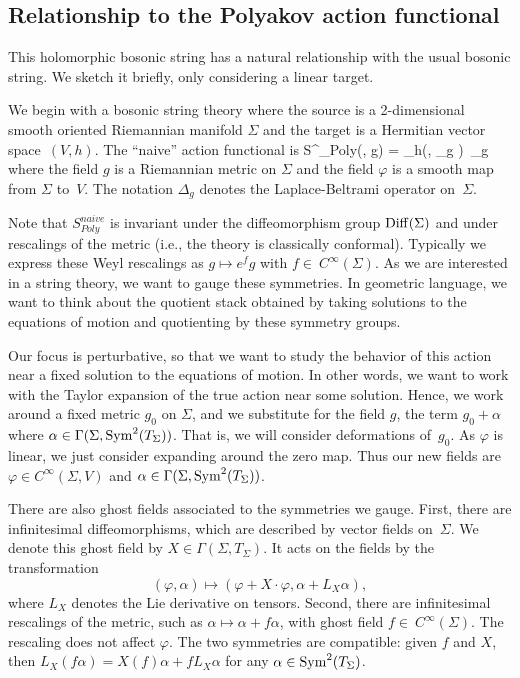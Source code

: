 \subsection{Relationship to the Polyakov action functional}

This holomorphic bosonic string has a natural relationship with the usual bosonic string.
We sketch it briefly, only considering a linear target.

We begin with a bosonic string theory where the source is a 2-dimensional smooth oriented Riemannian manifold $\Sigma$ and the target is a Hermitian vector space~$(V,h)$. 
The ``naive'' action functional is
\ben
S^{}_{Poly}(\varphi, g) = \int_\Sigma h(\varphi, \Delta_{g} \varphi)\, \dvol_g
\een
where the field $g$ is a Riemannian metric on $\Sigma$ and the field $\varphi$ is a smooth map from $\Sigma$ to~$V$.
The notation $\Delta_g$ denotes the Laplace-Beltrami operator on~$\Sigma$. 

Note that $S^{naive}_{Poly}$ is invariant under the diffeomorphism group ${\rm Diff}(\Sigma)$ and under rescalings of the metric
(i.e., the theory is classically conformal).
Typically we express these Weyl rescalings as $g \mapsto e^{f} g$ with $f \in~C^\infty(\Sigma)$.
As we are interested in a string theory, we want to gauge these symmetries.
In geometric language, we want to think about the quotient stack 
obtained by taking solutions to the equations of motion and quotienting by these symmetry groups.

Our focus is perturbative, so that we want to study the behavior of this action near a fixed solution to the equations of motion.
In other words, we want to work with the Taylor expansion of the true action near some solution.
Hence, we work around a fixed metric $g_0$ on $\Sigma$, 
and we substitute for the field $g$,
the term $g_0+\alpha$ where $\alpha \in \Gamma(\Sigma,{\rm Sym}^2(T_\Sigma))$.
That is, we will consider deformations of~$g_0$.
As $\varphi$ is linear, we just consider expanding around the zero map.
Thus our new fields are $\varphi \in C^\infty(\Sigma,V)$ and $\alpha \in \Gamma(\Sigma,{\rm Sym}^2(T_\Sigma))$.

There are also ghost fields associated to the symmetries we gauge.
First, there are infinitesimal diffeomorphisms,  which are described by vector fields on~$\Sigma$.
We denote this ghost field by $X \in \Gamma(\Sigma,T_\Sigma)$.
It acts on the fields by the transformation 
\[
(\varphi,\alpha) \mapsto (\varphi + X \cdot \varphi, \alpha + L_X \alpha), 
\]
where $L_X$ denotes the Lie derivative on tensors.
Second, there are infinitesimal rescalings of the metric, 
such as $\alpha \mapsto \alpha + f \alpha$, 
with ghost field $f \in~C^\infty(\Sigma)$.
The rescaling does not affect $\varphi$.
The two symmetries are compatible: 
given $f$ and $X$, then $L_{X} (f \alpha) = X(f) \alpha + f L_X \alpha$ for any $\alpha \in {\rm Sym}^2(T_\Sigma)$.


